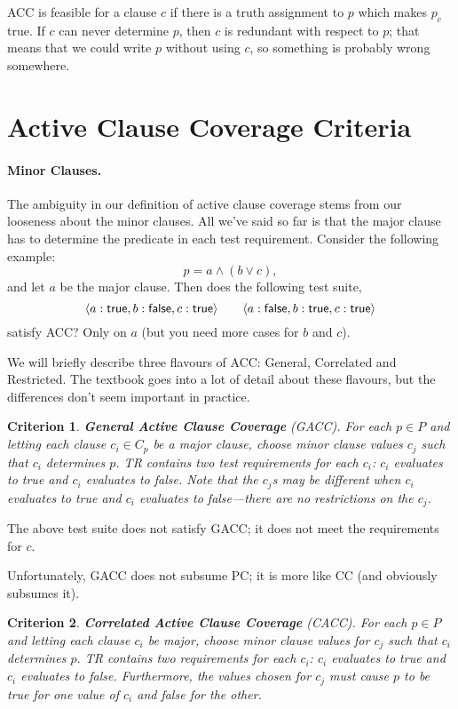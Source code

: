 \documentclass[11pt]{article}
\newtheorem{crit}{Criterion}
\newcommand{\true}{\mbox{\sf true}}
\newcommand{\false}{\mbox{\sf false}}
\begin{document}
ACC is feasible for a clause $c$ 
if there is a truth assignment to $p$ which makes $p_c$ true.
If $c$ can never determine $p$, then $c$ is redundant with respect to $p$;
that means that we could write $p$ without using $c$, so something is 
probably wrong somewhere.

\section*{Active Clause Coverage Criteria}

\paragraph{Minor Clauses.} The ambiguity in our definition of active clause
coverage stems from our looseness about the minor clauses. All we've
said so far is that the major clause has to determine the predicate
in each test requirement. Consider the following example:
\[ p = a \wedge (b \vee c), \]
and let $a$ be the major clause. Then does the following test suite, 
\[ \langle a:\true, b:{\bf \false}, c:\true \rangle \qquad
\langle a:\false, b:{\bf \true}, c: \true \rangle \]
satisfy ACC? Only on $a$ (but you need more cases for $b$ and $c$).

We will briefly describe three flavours of ACC: General, Correlated and
Restricted. The textbook goes into a lot of detail about these flavours,
but the differences don't seem important in practice.

\begin{crit}
{\bf General Active Clause Coverage} (GACC). For each $p \in P$ and letting
each clause $c_i \in C_p$ be a major clause, choose minor clause values
$c_j$ such that $c_i$ determines $p$. TR contains two test requirements
for each $c_i$: $c_i$ evaluates to true and $c_i$ evaluates to false.
Note that the $c_j$s may be different when $c_i$ evaluates to true and
$c_i$ evaluates to false---there are no restrictions on the $c_j$.
\end{crit}

The above test suite does not satisfy GACC; it does not meet the
requirements for $c$.

Unfortunately, GACC does not subsume PC; it is more
like CC (and obviously subsumes it).

\begin{crit}
{\bf Correlated Active Clause Coverage} (CACC). For each $p \in P$ and
letting each clause $c_i$ be major, choose minor clause values
for $c_j$ such that $c_i$ determines $p$. TR contains two requirements
for each $c_i$: $c_i$ evaluates to true and $c_i$ evaluates to false.
Furthermore, the values chosen for $c_j$ must cause $p$ to be true for
one value of $c_i$ and false for the other.
\end{crit}
\end{document}
